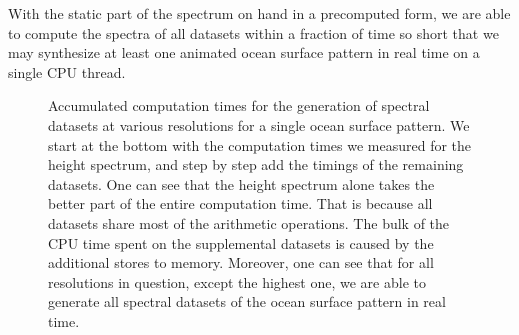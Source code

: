 With the static part of the spectrum on hand in a precomputed form, we are able
to compute the spectra of all datasets within a fraction of time so short that
we may synthesize at least one animated ocean surface pattern in real time on
a single CPU thread.
%
%
\begin{figure}
\centering
\mydata
{}
\caption[Accumulated computation times for the generation of spectral datasets at
various resolutions for a single ocean surface pattern.]{
Accumulated computation times for the generation of spectral datasets at
various resolutions for a single ocean surface pattern.
We start at the bottom with the computation times we measured for the height
spectrum, and step by step add the timings of the remaining datasets.
One can see that the height spectrum alone takes the better
part of the entire computation time.
That is because all datasets share most of the arithmetic operations.
The bulk of the CPU time spent on the supplemental datasets is caused by the
additional stores to memory.
Moreover, one can see that for all resolutions in question, except the highest
one, we are able to generate all spectral datasets of the ocean surface pattern
in real time.}
\label{fig:results:h}
\end{figure}
